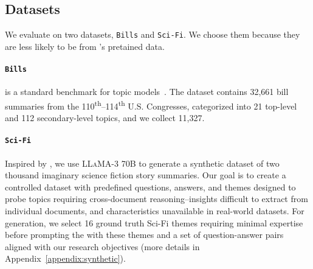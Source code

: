 \subsection{Datasets}\label{sec:datasets}
We evaluate on two datasets, \texttt{Bills} and \texttt{Sci-Fi}. We choose them because they are less likely to be from \mm{}'s pretained data.


\paragraph{\texttt{Bills}}
%
is a standard
benchmark for topic
models~\cite{AdlerWilkersonBillsProject}.
%
The dataset contains 32,661 bill summaries from the
110\textsuperscript{th}--114\textsuperscript{th} U.S. Congresses,
categorized into 21 top-level and 112 secondary-level topics, and we collect 11,327.



%

% 

\paragraph{\texttt{Sci-Fi}}%
%
Inspired by \citet{lam2024concept}, we use \textsc{LLaMA-3 70B} to
generate a synthetic dataset of two thousand
%
%
imaginary science fiction story summaries.
%
Our goal is to create a controlled
dataset with predefined questions, answers, and themes designed to
probe topics requiring cross-document reasoning--insights difficult to
extract from individual documents, and characteristics unavailable in
real-world datasets. For generation, we select 16 ground truth Sci-Fi themes requiring minimal expertise before prompting the \mm{} with these
themes and a set of question-answer pairs aligned with our research
objectives (more details in Appendix~\ref{appendix:synthetic}).

